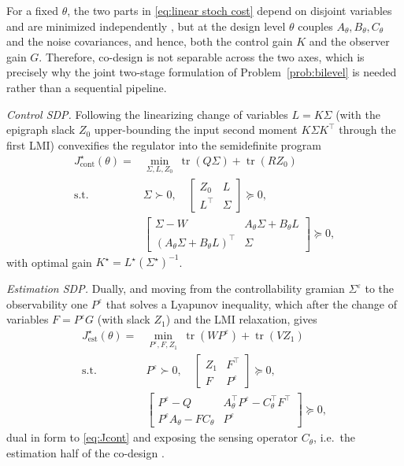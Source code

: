 \documentclass[twocolumn,amsthm]{autart}
\begin{document}
For a
fixed $\theta$, the two parts in \eqref{eq:linear stoch cost} depend on disjoint variables and are minimized
independently \cite{tzoumas2021lqg}, but at the design level $\theta$ couples
$A_\theta,B_\theta,C_\theta$ and the noise covariances, and hence, both the control
gain $K$ and the observer gain $G$. Therefore, co-design is not separable across the two axes, which is precisely why the joint
two-stage formulation of Problem~\ref{prob:bilevel} is needed rather than a
sequential pipeline.

\emph{Control SDP.} Following the linearizing change of
variables $L=K\Sigma$ (with the epigraph slack $Z_0$ upper-bounding the input
second moment $K\Sigma K^\top$ through the first LMI) convexifies the regulator
into the semidefinite program
\begin{equation}\label{eq:Jcont}
\begin{aligned}
J_{\mathrm{cont}}^\star(\theta) = &\min_{\Sigma,L,Z_0}\
\operatorname{tr}(Q\Sigma) + \operatorname{tr}(R Z_0)\\
\text{s.t. } & \Sigma \succ 0, \quad
\begin{bmatrix} Z_0 & L \\ L^\top & \Sigma \end{bmatrix}
\succeq 0,\\
& \begin{bmatrix}
\Sigma - W & A_\theta\Sigma + B_\theta L \\
(A_\theta\Sigma + B_\theta L)^\top & \Sigma
\end{bmatrix} \succeq 0,
\end{aligned}
\end{equation}
with optimal gain $K^\star = L^\star (\Sigma^\star)^{-1}$.

\emph{Estimation SDP.} Dually, and moving from the controllability gramian $\Sigma^\varepsilon$ to the observability one $P^\varepsilon$ that solves a
Lyapunov inequality, which after the change of variables $F = P^\varepsilon G$
(with slack $Z_1$) and the LMI relaxation, gives
\begin{equation}\label{eq:Jest}
\begin{aligned}
J_{\mathrm{est}}^\star(\theta) = &\min_{P^\varepsilon,F,Z_1}\
\operatorname{tr}(W P^\varepsilon) + \operatorname{tr}(V Z_1)\\
\text{s.t. } & P^\varepsilon \succ 0, \quad
\begin{bmatrix} Z_1 & F^\top \\ F & P^\varepsilon \end{bmatrix}
 \succeq 0,\\
& \begin{bmatrix}
P^\varepsilon - Q & A_\theta^\top P^\varepsilon - C_\theta^\top F^\top \\
P^\varepsilon A_\theta - F C_\theta & P^\varepsilon
\end{bmatrix} \succeq 0,
\end{aligned}
\end{equation}
dual in form to \eqref{eq:Jcont} and exposing the sensing operator $C_\theta$,
i.e.\ the estimation half of the co-design \cite{li2008integrating}.
\end{document}
